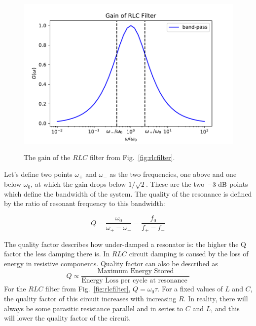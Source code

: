\documentclass[12pt,oneside]{book}
\begin{document}
\begin{figure}[htbp]
\begin{center}
\includegraphics[height=0.3\textheight]{figs/rlcgain.pdf} \\
\caption{ The gain of the $RLC$ filter from Fig.~\ref{fig:rlcfilter}.}
\label{fig:rlcgain}
\end{center}
\end{figure}


Let's define two points $\omega_+$ and $\omega_-$ as the two
frequencies, one above and one below $\omega_0$, at which the gain
drops below $1/\sqrt{2}$.  These are the two $-3~\rm dB$ points which
define the bandwidth of the system.  The quality of the
resonance is defined by the ratio of resonant frequency to this bandwidth:

\begin{displaymath}
Q = \frac{\omega_0}{\omega_+ - \omega_-} = \frac{f_0}{f_+-f_-}
\end{displaymath}

The quality factor describes how under-damped a resonator is: the higher the Q factor the less damping there is. In $RLC$ circuit damping is caused by the loss of energy in resistive components. Quality factor can also be described as 
\begin{displaymath}
Q \propto \frac{\mbox{Maximum Energy Stored}}{\mbox{Energy Loss per cycle at resonance }}
\end{displaymath}
For the $RLC$ filter from Fig.~\ref{fig:rlcfilter}, $Q=\omega_0 \tau$. For a fixed values of $L$ and $C$, the quality factor of this circuit increases with increasing $R$. In reality, there will always be some parasitic resistance parallel and in series to $C$ and $L$, and this will lower the quality factor of the circuit.
\end{document}
